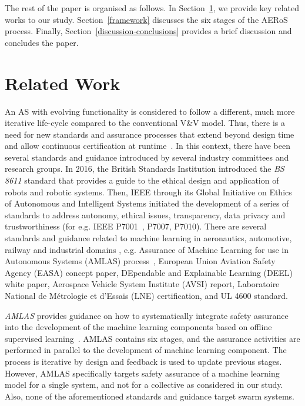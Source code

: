 \documentclass[runningheads]{llncs}
\begin{document}
The rest of the paper is organised as follows. 
In Section~\ref{relatedwork}, we provide key related works to our study. Section~\ref{framework} discusses the six stages of the AERoS process. Finally, Section~\ref{discussion-conclusions} provides a brief discussion and concludes the paper. 

\section{Related Work}\label{relatedwork}%
An AS with evolving functionality is considered to follow a different, much more iterative life-cycle compared to the conventional V\&V model. 
Thus, there is a need for new standards and assurance processes that extend beyond design time and allow continuous certification at runtime~\cite{Rushby2008}. 
In this context, there have been several standards and guidance introduced by several industry committees and research groups. In 2016, the British Standards Institution introduced the \emph{BS 8611} standard that provides a guide to the ethical design and application of robots and robotic systems. %
Then, IEEE through its Global Initiative on Ethics of Autonomous and Intelligent Systems initiated the development of a series of standards to address autonomy, ethical issues, transparency, data privacy and trustworthiness (for e.g. IEEE P7001~\cite{IEEE-P7001}, P7007, P7010). 
There are several standards and guidance related to machine learning in aeronautics, automotive, railway and industrial domains \cite{Kaakai2022}, e.g. Assurance of Machine Learning for use in Autonomous Systems (AMLAS) process~\cite{Hawkins2021}, European Union Aviation Safety Agency (EASA) concept paper, DEpendable and Explainable Learning (DEEL) white paper, Aerospace Vehicle System Institute (AVSI) report, Laboratoire National de Métrologie et d'Essais (LNE) certification, and UL 4600 standard. 

\emph{AMLAS} provides guidance on how to systematically integrate safety assurance into the development of the machine learning components based on offline supervised learning~\cite{Hawkins2021}. 
AMLAS contains six stages, and the assurance activities are performed in parallel to the development of machine learning component. 
The process is iterative by design and feedback is used to update previous stages. 
However, AMLAS specifically targets safety assurance of a machine learning model for a single system, and not for a collective as considered in our study. 
Also, none of the aforementioned standards and guidance target swarm systems. 
\end{document}
